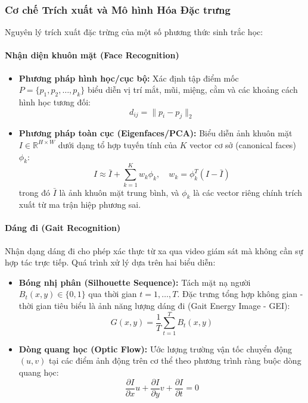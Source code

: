 \subsubsection{Cơ chế Trích xuất và Mô hình Hóa Đặc trưng}
Nguyên lý trích xuất đặc trừng của một số phương thức sinh trắc học:
\paragraph{Nhận diện khuôn mặt (Face Recognition)}
\begin{itemize}
    \item \textbf{Phương pháp hình học/cục bộ:} Xác định tập điểm mốc $P = \{p_1, p_2, \dots, p_k\}$ biểu diễn vị trí mắt, mũi, miệng, cằm và các khoảng cách hình học tương đối:
    \begin{equation}
        d_{ij} = \| p_i - p_j \|_2
    \end{equation}
    \item \textbf{Phương pháp toàn cục (Eigenfaces/PCA):} Biểu diễn ảnh khuôn mặt $I \in \mathbb{R}^{H \times W}$ dưới dạng tổ hợp tuyến tính của $K$ vector cơ sở (canonical faces) $\phi_k$:
    \begin{equation}
        I \approx \bar{I} + \sum_{k=1}^K w_k \phi_k, \quad w_k = \phi_k^T (I - \bar{I})
    \end{equation}
    trong đó $\bar{I}$ là ảnh khuôn mặt trung bình, và $\phi_k$ là các vector riêng chính trích xuất từ ma trận hiệp phương sai.
\end{itemize}

\paragraph{Dáng đi (Gait Recognition)}
Nhận dạng dáng đi cho phép xác thực từ xa qua video giám sát mà không cần sự hợp tác trực tiếp. Quá trình xử lý dựa trên hai biểu diễn:
\begin{itemize}
    \item \textbf{Bóng nhị phân (Silhouette Sequence):} Tách mặt nạ người $B_t(x, y) \in \{0, 1\}$ qua thời gian $t = 1, \dots, T$. Đặc trưng tổng hợp không gian - thời gian tiêu biểu là ảnh năng lượng dáng đi (Gait Energy Image - GEI):
    \begin{equation}
        G(x, y) = \frac{1}{T} \sum_{t=1}^T B_t(x, y)
    \end{equation}
    \item \textbf{Dòng quang học (Optic Flow):} Ước lượng trường vận tốc chuyển động $(u, v)$ tại các điểm ảnh động trên cơ thể theo phương trình ràng buộc dòng quang học:
    \begin{equation}
        \frac{\partial I}{\partial x} u + \frac{\partial I}{\partial y} v + \frac{\partial I}{\partial t} = 0
    \end{equation}
\end{itemize}

